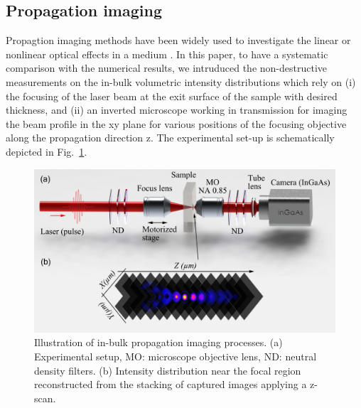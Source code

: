 \documentclass[9pt,twocolumn,twoside]{osajnl}
\begin{document}
\subsection{ Propagation imaging}
Propagtion imaging methods have been widely used to investigate the linear or nonlinear optical effects in a medium \cite{li2016quantitative, wang2020ultrafast}. In this paper, to have a systematic comparison with the numerical results, we intruduced the non-destructive measurements on the in-bulk volumetric intensity distributions which rely on (i) the focusing of the laser beam at the exit surface of the sample with desired thickness, and (ii) an inverted microscope working in transmission for imaging the beam profile in the xy plane for various positions of the focusing objective along the propagation direction z. The experimental set-up is schematically depicted in Fig.~\ref{fig:2}.
\begin{figure}
	\centering
	\includegraphics[width=\linewidth]{../AppOptics/figures/setup.pdf}
	\caption{Illustration of in-bulk propagation imaging processes. (a) Experimental setup, MO: microscope objective lens, ND: neutral density filters. (b) Intensity distribution near the focal region reconstructed from the stacking of captured images applying a z-scan.}\label{fig:2}
\end{figure}
\end{document}
